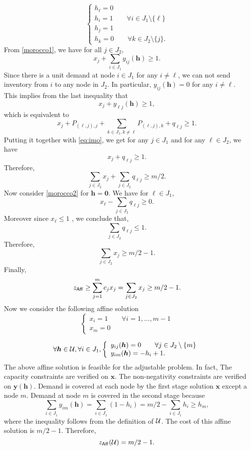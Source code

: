 \documentclass[moor]{informs1}              %
\newcommand{\mb}[1]{\ensuremath{\boldsymbol{#1}}}
\begin{document}
\begin{APPENDICES}
$$
 \left\{
    \begin{array}{ll}
        h_{\ell} =0  \\
        h_i = 1 \qquad \forall i \in J_1 \setminus \{\ell\} \\
        h_j = 1 \\
        h_k= 0  \qquad \forall k \in J_2 \setminus \{j\}.
    \end{array}
\right.
$$
From \eqref{morocco1}, we have for all $j \in J_2$,
$$ x_j + \sum_{i \in J_1} y_{ij} ( \mb h) \geq 1.$$
Since there is a unit demand at node $i \in J_1$ for any $i \neq \ell$, we can not send inventory from $i$ to any node in $J_2$. In particular, $y_{ij}(\mb h)= 0 $ for any $i \neq \ell$. This implies from the last inequality that
$$ x_j + y_{\ell j} ( \mb h) \geq 1,$$
which is equivalent to 
$$ x_j + P_{(\ell,j),j} + \sum_{k \in J_1, k\neq \ell}P_{(\ell,j),k}  + q_{\ell j} \geq 1.$$
Putting it together with \eqref{eq:imo}, we get for any $j \in J_1$ and for any $\ell \in J_2$, we have
$$ x_j + q_{\ell j} \geq 1.$$
Therefore,
$$ \sum_{j \in J_2} x_j + \sum_{j \in J_2} q_{\ell j}  \geq m/2.$$
Now consider \eqref{morocco2} for $ \mb h =\mb 0$. We have for $ \ell \in J_1$,
$$ x_{\ell} - \sum_{j \in J_2}  q_{\ell j} \geq 0.$$
Moreover since $x_{\ell} \leq 1$ , we conclude that,
$$ \sum_{j \in J_2}  q_{\ell j}  \leq 1.$$
Therefore, 
$$ \sum_{j \in J_2} x_j   \geq m/2 -1.$$
Finally,
$$ z_{\sf Aff}  \geq   \sum_{j=1}^m  c_j x_j   =  \sum_{j \in J_2}  x_j  \geq m/2 -1.$$
Now we consider the following affine solution
$$
 \left\{
    \begin{array}{ll}
        x_i= 1 \qquad \forall i=1, \ldots, m-1  \\
        x_m= 0
    \end{array}
\right.
$$

$$
\forall {\mb h} \in {\cal U},  \forall i \in J_1, \left\{
    \begin{array}{ll}
        y_{ij}(\mb h)= 0  \qquad  \forall j \in J_2 \setminus \{m \}  \\
        y_{im}(\mb h)= -h_i +1.
    \end{array}
\right.
$$
The above affine solution is feasible for the adjustable problem. In fact, The capacity constraints are verified on $\mb x$. The non-negativity constraints are verified on $\mb y( \mb h) $. Demand is covered at each node by the first stage solution $\mb x$  except a node $m$. Demand at node $m$ is covered in the second stage because
 $$ \sum_{i \in J_1} y_{im}(\mb h) = \sum_{i \in J_1} (1 -h_i) = m/2 - \sum_{i \in J_1}  h_i  \geq h_m,$$ 
 where the inequality follows from the definition of $\cal U$.  The cost of this affine solution is $m/2 -1$. Therefore,
 $$ z_{\sf Aff} ( {\cal U})= m/2 -1.$$

\end{APPENDICES}
\end{document}
